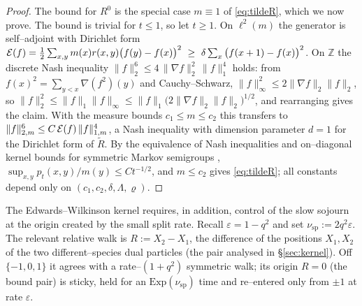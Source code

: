 \documentclass[11pt]{article}
\theoremstyle{plain}
\theoremstyle{definition}
\theoremstyle{remark}
\newcommand{\Z}{\mathbb{Z}}\newcommand{\R}{\mathbb{R}}\newcommand{\N}{\mathbb{N}}
\newcommand{\eps}{\varepsilon}\newcommand{\Exp}{\mathrm{Exp}}
\begin{document}
\begin{proof}
The bound for $R^0$ is the special case $m\equiv1$ of \eqref{eq:tildeR}, which we now
prove. The bound is trivial for $t\le1$, so let $t\ge1$. On $\ell^2(m)$
the generator is self--adjoint with Dirichlet form
$\mathcal E(f)=\tfrac12\sum_{x,y}m(x)r(x,y)\big(f(y)-f(x)\big)^2
\ \ge\ \delta\sum_x\big(f(x+1)-f(x)\big)^2$. On $\Z$ the discrete Nash inequality
$\|f\|_2^6\le4\,\|\nabla f\|_2^2\,\|f\|_1^4$ holds: from
$f(x)^2=\sum_{y<x}\nabla(f^2)(y)$ and Cauchy--Schwarz,
$\|f\|_\infty^2\le2\|\nabla f\|_2\|f\|_2$, so
$\|f\|_2^2\le\|f\|_1\|f\|_\infty\le\|f\|_1\big(2\|\nabla f\|_2\|f\|_2\big)^{1/2}$,
and rearranging gives the claim. With the measure bounds $c_1\le m\le c_2$ this
transfers to $\|f\|_{2,m}^6\le C\,\mathcal E(f)\,\|f\|_{1,m}^4$, a Nash inequality with
dimension parameter $d=1$ for the Dirichlet form of $\widetilde R$. By the
equivalence of Nash inequalities and on--diagonal kernel bounds for symmetric Markov
semigroups \cite{CKS}, $\sup_{x,y}p_t(x,y)/m(y)\le Ct^{-1/2}$, and $m\le c_2$ gives
\eqref{eq:tildeR}; all constants depend only on $(c_1,c_2,\delta,\Lambda,\varrho)$.
\end{proof}

The Edwards--Wilkinson kernel requires, in addition, control of the slow sojourn at the
origin created by the small split rate. Recall $\eps=1-q^2$ and set
$\nu_{\mathrm{sp}}:=2q^2\eps$. The relevant relative walk is $R:=X_2-X_1$, the
difference of the positions $X_1,X_2$ of the two different--species dual particles (the
pair analysed in \S\ref{sec:kernel}). Off $\{-1,0,1\}$ it agrees with a rate--$(1+q^2)$
symmetric walk; its origin $R=0$ (the bound pair) is sticky, held for an
$\Exp(\nu_{\mathrm{sp}})$ time and re--entered only from $\pm1$ at rate $\eps$.
\end{document}

